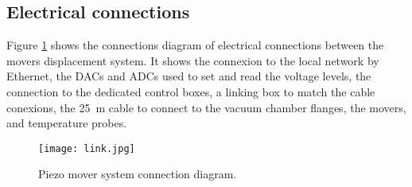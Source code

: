 \subsection{Electrical connections}
Figure \ref{f:conndiag} shows the connections diagram of electrical connections between the movers displacement system. It shows the connexion to the local network by Ethernet, the DACs and ADCs used to set and read the voltage levels, the connection to the dedicated control boxes, a linking box to match the cable conexions, the 25~m cable to connect to the vacuum chamber flanges, the movers, and temperature probes.\par
\begin{figure}[hbt]
\hspace*{1.4cm}\texttt{[image: link.jpg]}\caption{Piezo mover system connection diagram.}\label{f:conndiag}
\end{figure}
